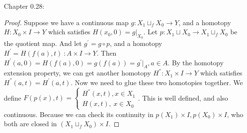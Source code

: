 \documentclass[]{book}
\theoremstyle{definition}
\begin{document}
Chapter 0.28:
\begin{proof}
    Suppose we have a continuous map $g: X_1 \sqcup _fX_0 \to Y$, and a homotopy $H: X_0 \times I \to Y$ which satisfies $H(x_0,0)= g|_{X_0}$.
    Let $p:X_1 \sqcup X_0 \to X_1 \sqcup_f X_0$ be the quotient map. And let $g^{'}= g \circ p$, and a homotopy $H^{'}= H(f(a),t)\ : A\times I \to Y$. Then $H^{'}(a,0)=H(f(a),0)=g(f(a))=g^{'}|_{A}, a\in A$. By the homotopy extension property, we can get another homotopy $H^{''}: X_1 \times I \to Y$ which satisfies $H^{''}(a,t)=H^{'}(a,t).$ Now we need to glue these two homotopies together. We define $F(p(x),t)=\begin{cases}
        H^{''}(x,t), x\in X_1\\
        H(x,t),\ x\in X_0
    \end{cases}$. This is well defined, and also continuous. Because we can check its continuity in $p(X_1)\times I, p(X_0)\times I$, who both are closed in $(X_1 \sqcup_fX_0 )\times I$.
\end{proof}
\end{document}
